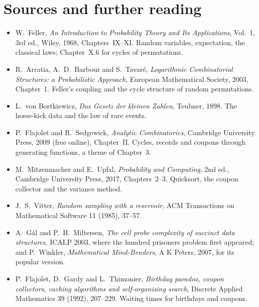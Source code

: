 \section*{Sources and further reading}

\begin{itemize}
\item W.~Feller, \emph{An Introduction to Probability Theory and Its Applications}, Vol.~1, 3rd ed., Wiley, 1968,
Chapters~IX--XI. Random variables, expectation, the classical laws; Chapter~X.6 for cycles of permutations.
\item R.~Arratia, A.~D.~Barbour and S.~Tavaré, \emph{Logarithmic Combinatorial Structures: a Probabilistic
Approach}, European Mathematical Society, 2003, Chapter~1. Feller's coupling and the cycle structure of random
permutations.
\item L.~von Bortkiewicz, \emph{Das Gesetz der kleinen Zahlen}, Teubner, 1898. The horse-kick data and the law of
rare events.
\item P.~Flajolet and R.~Sedgewick, \emph{Analytic Combinatorics}, Cambridge University Press, 2009 (free online),
Chapter~II. Cycles, records and coupons through generating functions, a theme of Chapter~3.
\item M.~Mitzenmacher and E.~Upfal, \emph{Probability and Computing}, 2nd ed., Cambridge University Press, 2017,
Chapters~2--3. Quicksort, the coupon collector and the variance method.
\item J.~S.~Vitter, \emph{Random sampling with a reservoir}, ACM Transactions on Mathematical Software 11 (1985),
37--57.
\item A.~Gál and P.~B.~Miltersen, \emph{The cell probe complexity of succinct data structures}, ICALP 2003, where the
hundred prisoners problem first appeared; and P.~Winkler, \emph{Mathematical Mind-Benders}, A K Peters, 2007, for
its popular version.
\item P.~Flajolet, D.~Gardy and L.~Thimonier, \emph{Birthday paradox, coupon collectors, caching algorithms and
self-organizing search}, Discrete Applied Mathematics 39 (1992), 207--229. Waiting times for birthdays and coupons.
\end{itemize}
